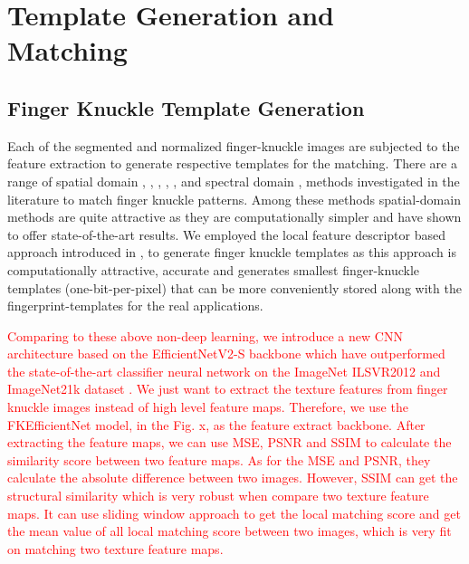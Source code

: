 \section{Template Generation and Matching\label{template-generation}}

\subsection{Finger Knuckle Template Generation\label{fk-template}}

Each of the segmented and normalized finger-knuckle images are subjected to the feature extraction to generate respective templates for the matching. There are a range of spatial domain \cite{sricharan2006knuckle}, \cite{kumar2009personal}, \cite{zhang2010online}, \cite{zhu2010multimodal}, \cite{zheng20163d}, \cite{kumar2016personal} and spectral domain \cite{aoyama2011finger}, \cite{kumar2015recovering} methods investigated in the literature to match finger knuckle patterns. Among these methods spatial-domain methods are quite attractive as they are computationally simpler and have shown to offer state-of-the-art results.  We employed the local feature descriptor based approach introduced in \cite{zheng20163d}, \cite{kumar2016personal} to generate finger knuckle templates as this approach is computationally attractive, accurate and generates smallest finger-knuckle templates (one-bit-per-pixel) that can be more conveniently stored along with the fingerprint-templates for the real applications. 

\textcolor{red}{Comparing to these above non-deep learning, we introduce a new CNN architecture based on the EfficientNetV2-S backbone \cite{tan2021efficientnetv2} which have outperformed the state-of-the-art classifier neural network on the ImageNet ILSVR2012 and ImageNet21k dataset \cite{russakovsky2015imagenet}. We just want to extract the texture features from finger knuckle images instead of high level feature maps. Therefore, we use the FKEfficientNet model, in the Fig. x, as the feature extract backbone. After extracting the feature maps, we can use MSE, PSNR and SSIM \cite{wang2004image} to calculate the similarity score between two feature maps. As for the MSE and PSNR, they calculate the absolute difference between two images. However, SSIM can get the structural similarity which is very robust when compare two texture feature maps. It can use sliding window approach to get the local matching score and get the mean value of all local matching score between two images, which is very fit on matching two texture feature maps.} 

